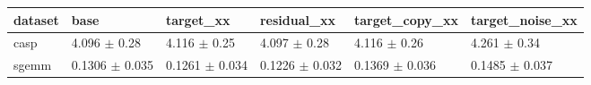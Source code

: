 \begin{tabular}{llllll}
\toprule
dataset & base & target\_xx & residual\_xx & target\_copy\_xx & target\_noise\_xx \\
\midrule
casp & 4.096 $\pm$ 0.28 & 4.116 $\pm$ 0.25 & 4.097 $\pm$ 0.28 & 4.116 $\pm$ 0.26 & 4.261 $\pm$ 0.34 \\
sgemm & 0.1306 $\pm$ 0.035 & 0.1261 $\pm$ 0.034 & 0.1226 $\pm$ 0.032 & 0.1369 $\pm$ 0.036 & 0.1485 $\pm$ 0.037 \\
\bottomrule
\end{tabular}
